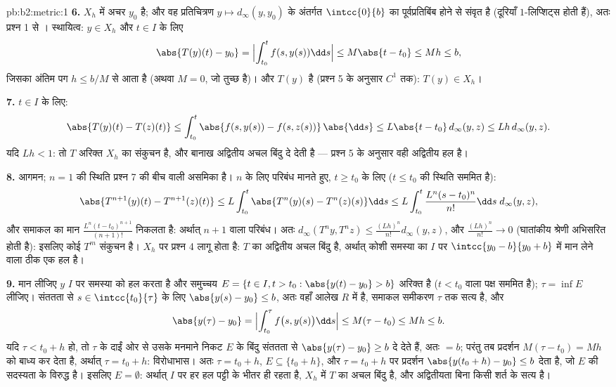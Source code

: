 \begin{solution}{pb:b2:metric:1}
\textbf{6.} $X_h$ में अचर $y_0$ है; और वह  प्रतिचित्रण $y
\mapsto d_\infty(y, y_0)$ के अंतर्गत
$\intcc{0}{b}$ का पूर्वप्रतिबिंब होने से संवृत है (दूरियाँ $1$-लिप्शिट्स होती
हैं), अतः प्रश्न 1 से । स्थायित्व: $y \in X_h$ और $t \in
I$ के लिए
\[
\abs{T(y)(t) - y_0} = \Bigl|\int_{t_0}^{t}f(s, y(s))\dd s\Bigr|
\leq M\abs{t - t_0} \leq Mh \leq b ,
\]
जिसका अंतिम पग $h \leq b/M$ से आता है (अथवा $M = 0$, जो तुच्छ है)। और $T(y)$  है
(प्रश्न 5 के अनुसार $C^1$ तक): $T(y) \in X_h$।

\textbf{7.} $t \in I$ के लिए:
\[
\abs{T(y)(t) - T(z)(t)} \leq \int_{t_0}^{t}\abs{f(s, y(s)) -
f(s, z(s))}\,\abs{\dd s} \leq L\abs{t - t_0}\,d_\infty(y,z)
\leq Lh\,d_\infty(y,z).
\]
यदि $Lh < 1$: तो $T$ अरिक्त  $X_h$ का संकुचन है, और बानाख अद्वितीय अचल
बिंदु दे देती है --- प्रश्न 5 के अनुसार वही अद्वितीय हल है।

\textbf{8.} आगमन; $n = 1$ की स्थिति प्रश्न 7 की बीच वाली असमिका है। $n$ के
लिए परिबंध मानते हुए, $t \geq t_0$ के लिए ($t \leq t_0$ की स्थिति सममित है):
\[
\abs{T^{n+1}(y)(t) - T^{n+1}(z)(t)}
\leq L\int_{t_0}^{t}\abs{T^n(y)(s) - T^n(z)(s)}\dd s
\leq L\int_{t_0}^{t}\frac{L^n(s - t_0)^n}{n!}\dd s\;
d_\infty(y,z),
\]
और समाकल का मान $\frac{L^n(t -
t_0)^{n+1}}{(n+1)!}$ निकलता है: अर्थात् $n + 1$ वाला परिबंध। अतः $d_\infty(T^n y, T^n z) \leq \frac{(Lh)^n}{n!}d_\infty(y, z)$, और
$\frac{(Lh)^n}{n!} \to 0$ (घातांकीय श्रेणी अभिसरित होती है): इसलिए कोई $T^m$ संकुचन है। 
$X_h$ पर प्रश्न 4 लागू होता है: $T$ का अद्वितीय अचल बिंदु है, अर्थात्
कोशी समस्या का $I$ पर $\intcc{y_0 - b}{y_0 + b}$ में मान लेने वाला ठीक एक हल है।

\textbf{9.} मान लीजिए $y$ $I$ पर समस्या को हल करता है और समुच्चय $E = \{t \in I, t > t_0 : \abs{y(t) - y_0} > b\}$
अरिक्त है ($t < t_0$ वाला पक्ष सममित है); $\tau = \inf E$ लीजिए। संततता से $s \in
\intcc{t_0}{\tau}$ के लिए
$\abs{y(s) - y_0} \leq b$, अतः वहाँ आलेख $R$ में है, समाकल समीकरण $\tau$ तक सत्य है, और
\[
\abs{y(\tau) - y_0} = \Bigl|\int_{t_0}^{\tau}f\bigl(s,
y(s)\bigr)\dd s\Bigr| \leq M(\tau - t_0) \leq Mh \leq b .
\]
यदि $\tau < t_0 + h$ हो, तो $\tau$ के दाईं ओर से उसके मनमाने निकट $E$ के बिंदु
संततता से $\abs{y(\tau) - y_0} \geq
b$ दे देते हैं, अतः $= b$; परंतु तब प्रदर्शन $M(\tau - t_0) =
Mh$ को बाध्य
कर देता है, अर्थात् $\tau = t_0 + h$: विरोधाभास। अतः $\tau = t_0 + h$, $E \subseteq \{t_0 + h\}$, और $\tau = t_0 + h$ पर
प्रदर्शन $\abs{y(t_0 + h) - y_0} \leq b$ देता है, जो $E$ की सदस्यता के विरुद्ध है। इसलिए $E = \emptyset$:
अर्थात् $I$ पर हर हल पट्टी के भीतर ही रहता है, $X_h$ में $T$ का अचल
बिंदु है, और अद्वितीयता बिना किसी शर्त के सत्य है।


\end{solution}
